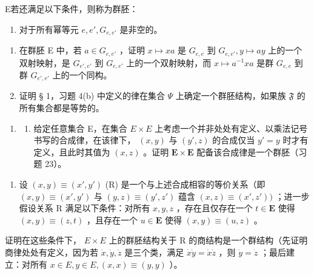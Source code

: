 E若还满足以下条件，则称为群胚：

\begin{enumerate}
\def\labelenumi{(\arabic{enumi})}
\setcounter{enumi}{3}
\tightlist
\item
  对于所有幂等元 \(e, e', G_{e, e'}\) 是非空的。
\end{enumerate}

\begin{enumerate}
\def\labelenumi{(\alph{enumi})}
\setcounter{enumi}{4}
\item
  在群胚 E 中，若 \(a \in G_{e,e'}\) ，证明 \(x \mapsto xa\) 是 \(G_{e,e}\) 到 \(G_{e,e'}, y \mapsto ay\) 上的一个双射映射，是 \(G_{e',e'}\) 到 \(G_{e,e'}\) 上的一个双射映射，而 \(x \mapsto a^{-1}xa\) 是群 \(G_{e,e}\) 到群 \(G_{e',e'}\) 上的一个同构。
\item
  证明 § 1，习题 4(b) 中定义的律在集合 \(\Psi\) 上确定一个群胚结构，如果族 \(\mathfrak{F}\) 的所有集合都是等势的。
\end{enumerate}

\begin{enumerate}
\def\labelenumi{\arabic{enumi}.}
\setcounter{enumi}{23}
\tightlist
\item
  \begin{enumerate}
  \def\labelenumii{(\alph{enumii})}
  \tightlist
  \item
  给定任意集合 E，在集合 \(E \times E\) 上考虑一个并非处处有定义、以乘法记号书写的合成律，在该律下， \((x, y)\) 与 \((y', z)\) 的合成仅当 \(y' = y\) 时才有定义，且此时其值为 \((x, z)\) 。证明 \(\mathbf{E} \times \mathbf{E}\) 配备该合成律是一个群胚（习题 23）。
  \end{enumerate}
\end{enumerate}

\begin{enumerate}
\def\labelenumi{(\alph{enumi})}
\setcounter{enumi}{1}
\tightlist
\item
  设 \((x, y) \equiv (x', y')\) (R) 是一个与上述合成相容的等价关系（即 \((x, y) \equiv (x', y')\) 与 \((y, z) \equiv (y', z')\) 蕴含 \((x, z) \equiv (x', z'))\) ；进一步假设关系 R 满足以下条件：对所有 \(x, y, z\) ，存在且仅存在一个 \(t \in \mathbf{E}\) 使得 \((x, y) \equiv (z, t)\) ，且存在一个 \(u \in \mathbf{E}\) 使得 \((x, y) \equiv (u, z)\) 。
\end{enumerate}

证明在这些条件下， \(E \times E\) 上的群胚结构关于 R 的商结构是一个群结构（先证明商律处处有定义，因为若 \(\dot{x}, \dot{y}, \dot{z}\) 是三个类，满足 \(\dot{x}\dot{y} = \dot{x}\dot{z}\) ，则 \(\dot{y} = \dot{z}\) ；最后建立：对所有 \(x \in E, y \in E, (x, x) \equiv (y, y)\) ）。

